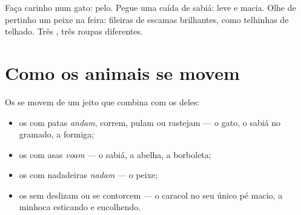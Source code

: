 \begin{example}\label{ex:g1:animals-around-us:covering}
Faça carinho num gato: pelo. Pegue uma  caída de sabiá: leve e
macia. Olhe de pertinho um peixe na feira: fileiras de escamas
brilhantes, como telhinhas de telhado. Três , três roupas
diferentes.
\end{example}

\section{Como os animais se movem}

\begin{proposition}\label{prop:g1:animals-around-us:moving}
Os  se movem de um jeito que combina com os  deles:
\begin{itemize}
  \item os  com patas \emph{andam}, correm, pulam ou rastejam
        --- o gato, o sabiá no gramado, a formiga;
  \item os  com asas \emph{voam} --- o sabiá, a
        abelha, a borboleta;
  \item os  com nadadeiras \emph{nadam} --- o peixe;
  \item os  sem  deslizam ou se contorcem --- o caracol
        no seu único pé macio, a minhoca esticando e encolhendo.
\end{itemize}
\end{proposition}
\admitted

